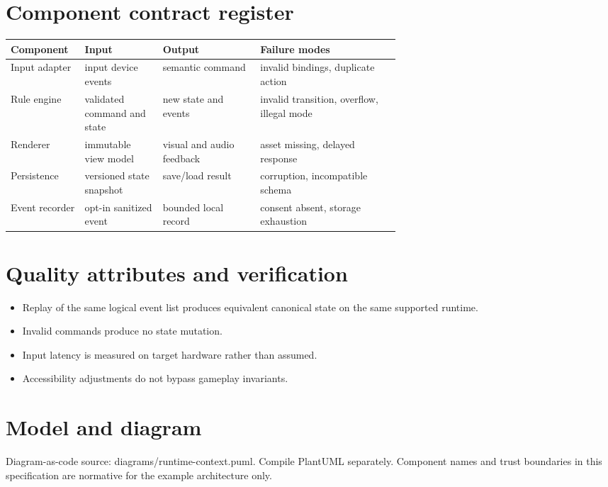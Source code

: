 \documentclass[11pt]{article}
\begin{document}
\section{Component contract register}
\begin{longtable}{@{}>{\raggedright\arraybackslash}p{0.19\linewidth}>{\raggedright\arraybackslash}p{0.20\linewidth}>{\raggedright\arraybackslash}p{0.25\linewidth}>{\raggedright\arraybackslash}p{}@{}}\toprule Component & Input & Output & Failure modes\\\midrule\endhead
Input adapter & input device events & semantic command & invalid bindings, duplicate action \\
Rule engine & validated command and state & new state and events & invalid transition, overflow, illegal mode \\
Renderer & immutable view model & visual and audio feedback & asset missing, delayed response \\
Persistence & versioned state snapshot & save/load result & corruption, incompatible schema \\
Event recorder & opt-in sanitized event & bounded local record & consent absent, storage exhaustion \\
\bottomrule\end{longtable}

\section{Quality attributes and verification}
\begin{itemize}
\item Replay of the same logical event list produces equivalent canonical state on the same supported runtime.
\item Invalid commands produce no state mutation.
\item Input latency is measured on target hardware rather than assumed.
\item Accessibility adjustments do not bypass gameplay invariants.
\end{itemize}

\section{Model and diagram}
Diagram-as-code source: diagrams/runtime-context.puml. Compile PlantUML separately. Component names and trust boundaries in this specification are normative for the example architecture only.
\end{document}
